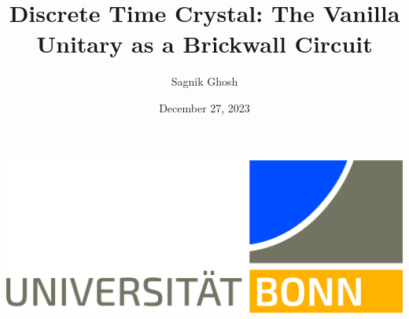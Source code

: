 \documentclass{amsproc}
\title{Discrete Time Crystal: The Vanilla Unitary as a Brickwall Circuit}                        %
\author{Sagnik Ghosh}
\date{December 27, 2023}            %
\begin{document}
\newtheorem{defn}[]{Definition}
\newtheorem{obs}[]{Observation}
\newtheorem{lem}[]{Lemma}
\newtheorem{thm}[]{Theorem}
\newtheorem{corr}[]{Corollary}
\newtheorem{conj}[]{Conjecture}
\newtheorem{prop}[]{Property}
\newtheorem{appr}[]{Approximation}
\newtheorem{claim}[]{Claim}
\newtheorem{notes}[]{Note}



\includegraphics[scale=0.03]{./.src/header/UNI_Bonn_Logo_Standard_RZ_Office.jpg}

\vspace{6mm}

\maketitle












%



\printbibliography
\end{document}
